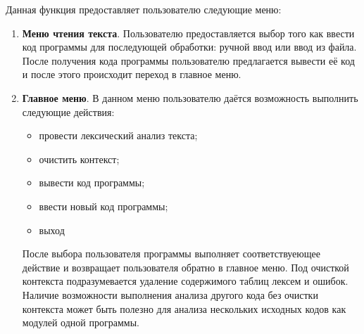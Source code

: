 \documentclass[a4paper,final]{article}
\begin{document}
Данная функция предоставляет пользователю следующие меню:
\begin{enumerate}
    \item \textbf{Меню чтения текста}. Пользователю предоставляется выбор того как ввести код программы для последующей обработки: ручной ввод или ввод из файла. После получения кода программы пользователю предлагается вывести её код и после этого происходит переход в главное меню.
    \item \textbf{Главное меню}. В данном меню пользователю даётся возможность выполнить следующие действия:
    \begin{itemize}
        \item провести лексический анализ текста;
        \item очистить контекст;
        \item вывести код программы;
        \item ввести новый код программы;
        \item выход
    \end{itemize}
    После выбора пользователя программы выполняет соответствуеющее действие и возвращает пользователя обратно в главное меню. Под очисткой контекста подразумевается удаление содержимого таблиц лексем и ошибок. Наличие возможности выполнения анализа другого кода без очистки контекста может быть полезно для анализа нескольких исходных кодов как модулей одной программы.
\end{enumerate}
\end{document}
